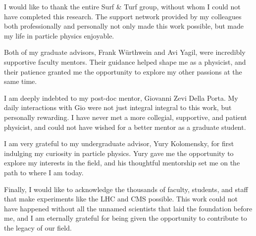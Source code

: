 \begin{frontmatter}
\begin{acknowledgements}
I would like to thank the entire Surf \& Turf group, without whom I could not have completed this research. The support network provided by my colleagues both professionally and personally not only made this work possible, but made my life in particle physics enjoyable.

Both of my graduate advisors, Frank W\"urthwein and Avi Yagil, were incredibly supportive faculty mentors. Their guidance helped shape me as a physicist, and their patience granted me the opportunity to explore my other passions at the same time.

I am deeply indebted to my post-doc mentor, Giovanni Zevi Della Porta. My daily interactions with Gio were not just integral integral to this work, but personally rewarding. I have never met a more collegial, supportive, and patient physicist, and could not have wished for a better mentor as a graduate student.

I am very grateful to my undergraduate advisor, Yury Kolomensky, for first indulging my curiosity in particle physics. Yury gave me the opportunity to explore my interests in the field, and his thoughtful mentorship set me on the path to where I am today.

Finally, I would like to acknowledge the thousands of faculty, students, and staff that make experiments like the LHC and CMS possible. This work could not have happened without all the unnamed scientists that laid the foundation before me, and I am eternally grateful for being given the opportunity to contribute to the legacy of our field.

\end{acknowledgements}                                                         


\end{frontmatter}
